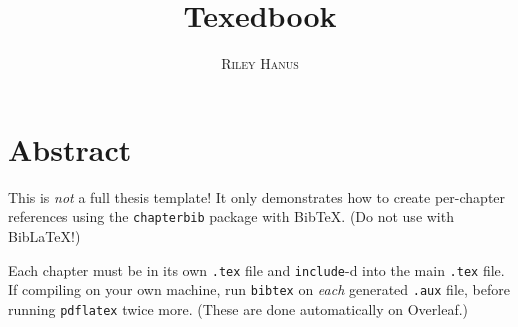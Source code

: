 \documentclass[11pt,oneside]{book}
\title{\Huge \textbf{Texedbook}}
\author{\textsc{Riley Hanus}}
\begin{document}
\frontmatter
\maketitle

\chapter*{Abstract}
This is \emph{not} a full thesis template! It only demonstrates how to create per-chapter references using the \texttt{chapterbib} package with BibTeX. (Do not use with BibLaTeX!)

Each chapter must be in its own \texttt{.tex} file and \texttt{include}-d into the main \texttt{.tex} file. If compiling on your own machine, run \texttt{bibtex} on \emph{each} generated \texttt{.aux} file, before running \texttt{pdflatex} twice more. (These are done automatically on Overleaf.)

\tableofcontents

\mainmatter



\backmatter

\end{document}
